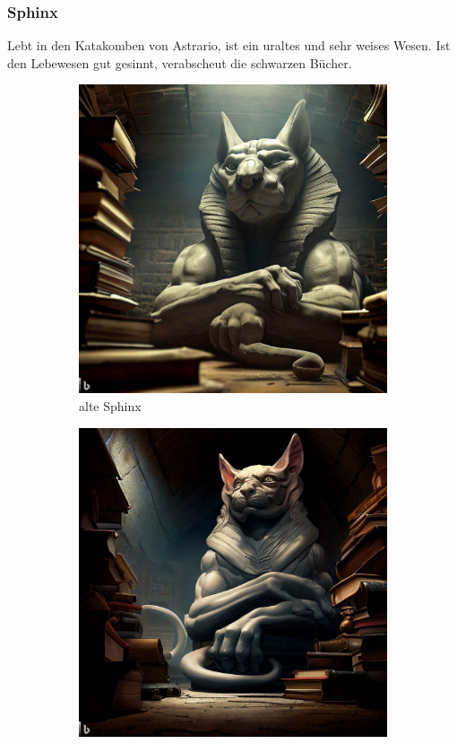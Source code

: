 \documentclass[11pt, twoside]{article}
\begin{document}
\subsubsection{Sphinx\label{sphinx}}
\label{sec:orgd2a8fb5}
Lebt in den Katakomben von Astrario, ist ein uraltes und sehr weises Wesen. Ist den Lebewesen gut gesinnt, verabscheut die schwarzen Bücher.
\begin{figure}[H]
\centering
\caption{Sphinx}
\label{fig:sphinx}
  \begin{subfigure}{0.3\textwidth}
    \centering
    \includegraphics[width=0.99\linewidth]{sphinx1.jpeg}
    \caption{alte Sphinx}
  \end{subfigure}%
  \begin{subfigure}{0.3\textwidth}
    \centering
    \includegraphics[width=0.99\linewidth]{sphinx2.jpeg}

\end{subfigure}
\end{figure}
\end{document}
